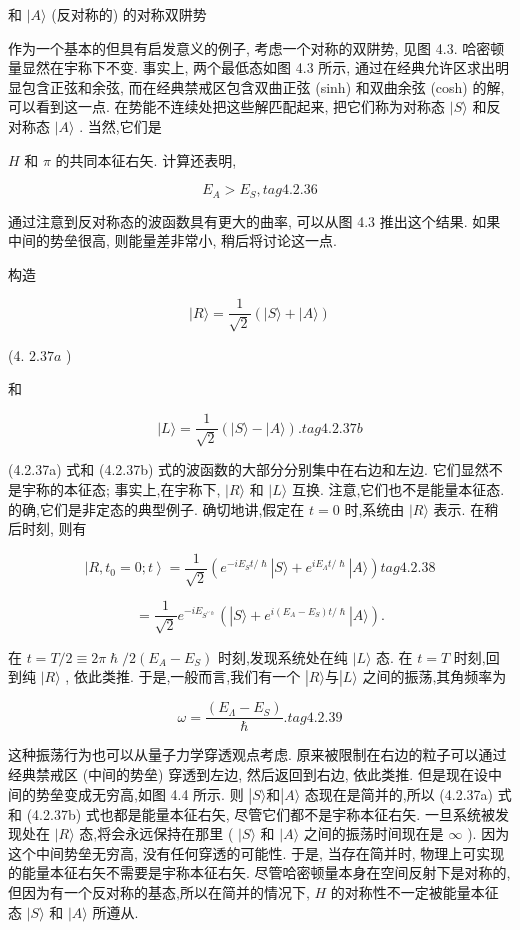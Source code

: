 和 $|A\rangle$ (反对称的) 的对称双阱势

作为一个基本的但具有启发意义的例子, 考虑一个对称的双阱势, 见图 4.3. 哈密顿量显然在宇称下不变. 事实上, 两个最低态如图 4.3 所示, 通过在经典允许区求出明显包含正弦和余弦, 而在经典禁戒区包含双曲正弦 (sinh) 和双曲余弦 (cosh) 的解, 可以看到这一点. 在势能不连续处把这些解匹配起来, 把它们称为对称态 $|S\rangle$ 和反对称态 $|A\rangle$ . 当然,它们是

$H$ 和 $\pi$ 的共同本征右矢. 计算还表明,

$$
{E}_{A} > {E}_{S}, tag{4.2.36}
$$

通过注意到反对称态的波函数具有更大的曲率, 可以从图 4.3 推出这个结果. 如果中间的势垒很高, 则能量差非常小, 稍后将讨论这一点.

构造

$$
|R\rangle = \frac{1}{\sqrt{2}}\left( {\left| {S\rangle + }\right| A\rangle }\right)
$$

(4. ${2.37a}$ )

和

$$
|L\rangle = \frac{1}{\sqrt{2}}\left( {\left| {S\rangle - }\right| A\rangle }\right) . tag{4. 2.37b}
$$

(4.2.37a) 式和 (4.2.37b) 式的波函数的大部分分别集中在右边和左边. 它们显然不是宇称的本征态; 事实上,在宇称下, $|R\rangle$ 和 $|L\rangle$ 互换. 注意,它们也不是能量本征态. 的确,它们是非定态的典型例子. 确切地讲,假定在 $t = 0$ 时,系统由 $|R\rangle$ 表示. 在稍后时刻, 则有

$$
\left| {R,{t}_{0} = 0;t}\right\rangle = \frac{1}{\sqrt{2}}\left( {{e}^{-i{E}_{S}t/\hslash }\left| {S\rangle + {e}^{i{E}_{\Lambda }t/\hslash }}\right| A\rangle }\right) tag{4. 2.38}
$$

$$
= \frac{1}{\sqrt{2}}{e}^{-i{E}_{{S}^{\prime \prime \hslash }}}\left( {\left| {S\rangle + {e}^{i\left( {{E}_{A} - {E}_{S}}\right) t/\hslash }}\right| A\rangle }\right) .
$$

在 $t = T/2 \equiv {2\pi }\hslash /2\left( {{E}_{A} - {E}_{S}}\right)$ 时刻,发现系统处在纯 $|L\rangle$ 态. 在 $t = T$ 时刻,回到纯 $|R\rangle$ , 依此类推. 于是,一般而言,我们有一个 $\left| {R\rangle \text{与}}\right| L\rangle$ 之间的振荡,其角频率为

$$
\omega = \frac{\left( {E}_{\Lambda } - {E}_{S}\right) }{\hslash }. tag{4. 2.39}
$$

这种振荡行为也可以从量子力学穿透观点考虑. 原来被限制在右边的粒子可以通过经典禁戒区 (中间的势垒) 穿透到左边, 然后返回到右边, 依此类推. 但是现在设中间的势垒变成无穷高,如图 4.4 所示. 则 $\left| {S\rangle \text{和}}\right| A\rangle$ 态现在是简并的,所以 (4.2.37a) 式和 (4.2.37b) 式也都是能量本征右矢, 尽管它们都不是宇称本征右矢. 一旦系统被发现处在 $|R\rangle$ 态,将会永远保持在那里 ( $|S\rangle$ 和 $|A\rangle$ 之间的振荡时间现在是 $\infty$ ). 因为这个中间势垒无穷高, 没有任何穿透的可能性. 于是, 当存在简并时, 物理上可实现的能量本征右矢不需要是宇称本征右矢. 尽管哈密顿量本身在空间反射下是对称的, 但因为有一个反对称的基态,所以在简并的情况下, $H$ 的对称性不一定被能量本征态 $|S\rangle$ 和 $|A\rangle$ 所遵从.

